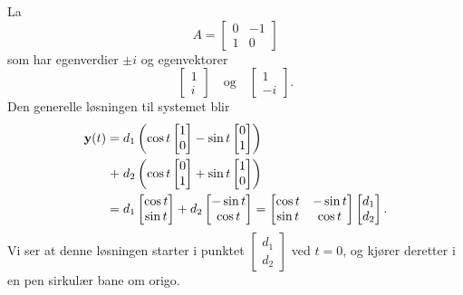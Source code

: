\begin{ex}
La 
\[
A=
\begin{bmatrix}
0 & -1   \\
1 & 0
\end{bmatrix}
\]
som har egenverdier $\pm i$ og egenvektorer 
\[
\begin{bmatrix}
1  \\
i 
\end{bmatrix}
\quad \text{og} \quad
\begin{bmatrix}
1  \\
-i 
\end{bmatrix}. 
\]
Den generelle løsningen til systemet blir 
\begin{align*}
\mathbf{y}(t)=\;&d_1 \left(\cos t\begin{bmatrix}  1 \\ 0\end{bmatrix}-\sin t\begin{bmatrix} 0 \\ 1\end{bmatrix}\right) 
\\+\;&d_2 \left(\cos t\begin{bmatrix} 0 \\ 1\end{bmatrix}+\sin t\begin{bmatrix}  1 \\ 0\end{bmatrix}\right)\\=\;&d_1\begin{bmatrix} \cos t \\ \sin t\end{bmatrix}+d_2\begin{bmatrix}  -\sin t \\ \cos t\end{bmatrix}=\begin{bmatrix} \cos t & -\sin t\\ \sin t & \cos t\end{bmatrix}\begin{bmatrix} d_1 \\ d_2 \end{bmatrix}.
\end{align*}
Vi ser at denne løsningen starter i punktet $\begin{bmatrix} d_1 \\ d_2 \end{bmatrix}$ ved $t=0$, og kjører deretter i en pen sirkulær bane om origo.
\end{ex}


